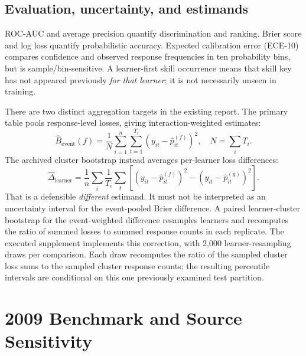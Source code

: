 \documentclass[11pt,a4paper]{article}
\begin{document}
\subsection{Evaluation, uncertainty, and estimands}
ROC-AUC and average precision quantify discrimination and ranking. Brier score and log loss quantify probabilistic accuracy. Expected calibration error (ECE-10) compares confidence and observed response frequencies in ten probability bins, but is sample/bin-sensitive. A learner-first skill occurrence means that skill key has not appeared previously \emph{for that learner}; it is not necessarily unseen in training.

There are two distinct aggregation targets in the existing report. The primary table pools response-level losses, giving interaction-weighted estimates:
\begin{equation}
\widehat{B}_{\mathrm{event}}(f)=\frac{1}{N}\sum_{i=1}^{n}\sum_{t=1}^{T_i}(y_{it}-\hat p_{it}^{(f)})^2,\quad N=\sum_i T_i.
\end{equation}
The archived cluster bootstrap instead averages per-learner loss differences:
\begin{equation}
\widehat{\Delta}_{\mathrm{learner}}=\frac{1}{n}\sum_i\frac{1}{T_i}\sum_t\left[(y_{it}-\hat p_{it}^{(f)})^2-(y_{it}-\hat p_{it}^{(g)})^2\right].
\end{equation}
That is a defensible \emph{different} estimand. It must not be interpreted as an uncertainty interval for the event-pooled Brier difference. A paired learner-cluster bootstrap for the event-weighted difference resamples learners and recomputes the ratio of summed losses to summed response counts in each replicate. The executed supplement implements this correction, with 2,000 learner-resampling draws per comparison. Each draw recomputes the ratio of the sampled cluster loss sums to the sampled cluster response counts; the resulting percentile intervals are conditional on this one previously examined test partition.

\section{2009 Benchmark and Source Sensitivity}
\end{document}
